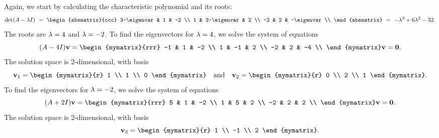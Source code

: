 \begin{solution}
  Again, we start by calculating the characteristic polynomial and its roots:
  \begin{equation*}
    \det(A-\eigenvar I)
    ~=~ \begin{absmatrix}{ccc}
      3-\eigenvar  & 1 & -2 \\
      1  & 3-\eigenvar &  2 \\
      -2 & 2 &  -\eigenvar  \\
    \end{absmatrix}
    ~=~ - \eigenvar^3 + 6\eigenvar^2 -32.
  \end{equation*}
  The roots are $\lambda=4$ and $\lambda=-2$. To find the
  eigenvectors for $\lambda=4$, we solve the system of equations
  \begin{equation*}
    (A-4I)\vect{v}
    =
    \begin{mymatrix}{rrr}
      -1  & 1 & -2 \\
      1  & -1 &  2 \\
      -2 & 2 &  -4 \\
    \end{mymatrix}\vect{v}
    = \vect{0}.
  \end{equation*}
  The solution space is 2-dimensional, with basis
  \begin{equation*}
    \vect{v}_1 = \begin{mymatrix}{r} 1 \\ 1 \\ 0 \end{mymatrix}
    \quad\mbox{and}\quad
    \vect{v}_2 = \begin{mymatrix}{r} 0 \\ 2 \\ 1 \end{mymatrix}.
  \end{equation*}
  To find the eigenvectors for $\lambda=-2$, we solve the system of
  equations
  \begin{equation*}
    (A+2I)\vect{v}
    =
    \begin{mymatrix}{rrr}
      5  & 1 & -2 \\
      1  & 5 &  2 \\
      -2 & 2 &  2 \\
    \end{mymatrix}\vect{v}
    = \vect{0}.
  \end{equation*}
  The solution space is 2-dimensional, with basis
  \begin{equation*}
    \vect{v}_3 = \begin{mymatrix}{r} 1 \\ -1 \\ 2 \end{mymatrix}.

\end{equation*}
\end{solution}
